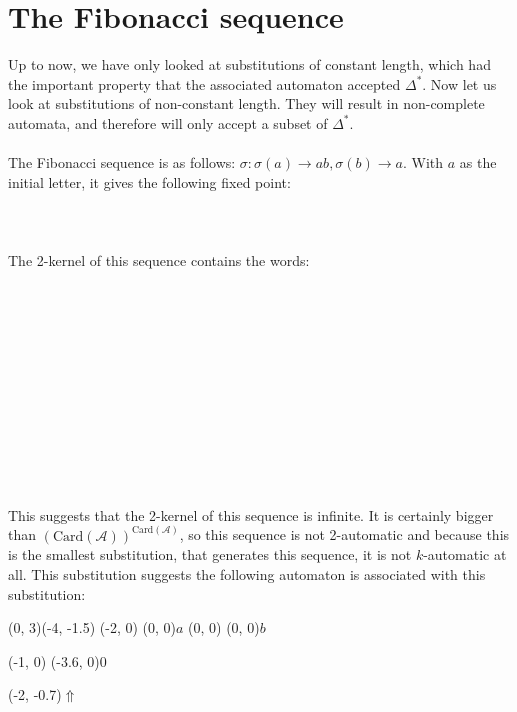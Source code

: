\documentclass{article}
\begin{document}
\section*{The Fibonacci sequence}
Up to now, we have only looked at substitutions of constant length, which had
the important property that the associated automaton accepted
$\Delta^*$. Now let us look at substitutions of non-constant
length. They will result in non-complete automata, and therefore will only
accept a subset of $\Delta^*$.\\
\\
The Fibonacci sequence is as follows: $\sigma: \sigma(a) \to ab,
\sigma(b) \to a$. With $a$ as the initial letter, it gives the
following fixed point:\\
\\
\\
\\
The 2-kernel of this sequence contains the words:\\
\\
\\
\\
\\
\\
\\
\\
\\
\\
\\
\monoit{}\\
\\
This suggests that the 2-kernel of this sequence is infinite. It is certainly
bigger than $(\mathrm{Card}(\mathcal{A}))^{\mathrm{Card}(\mathcal{A})}$, so
this sequence is not 2-automatic and because this is the smallest substitution,
that generates this sequence, it is not $k$-automatic at all. This substitution
suggests the following automaton is associated with this substitution:\\
\begin{graph}(0, 3)(-4, -1.5)
  (-2, 0) (0, 0){$a$}
  (0, 0)  (0, 0){$b$}

  (-1, 0) \freetext(-3.6, 0){0}
   
   

  \freetext(-2, -0.7){$\Uparrow$}
\end{graph}\\
\end{document}
